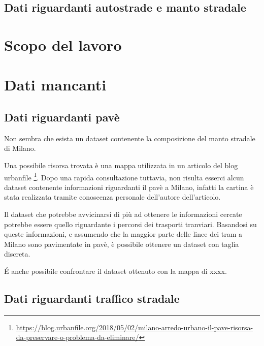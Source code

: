 \documentclass[a4paper]{report}
\begin{document}
\subsection{Dati riguardanti autostrade e manto stradale}

\section{Scopo del lavoro}

\section{Dati mancanti}

\subsection{Dati riguardanti pavè}
Non sembra che esista un dataset contenente la composizione del manto stradale di Milano.

Una possibile risorsa trovata è una mappa utilizzata in un articolo del blog urbanfile
\footnote{\url{https://blog.urbanfile.org/2018/05/02/milano-arredo-urbano-il-pave-risorsa-da-preservare-o-problema-da-eliminare/}}.
Dopo una rapida consultazione tuttavia, non risulta esserci alcun dataset contenente informazioni 
riguardanti il pavè a Milano, infatti la cartina è stata realizzata tramite conoscenza personale dell'autore dell'articolo.

Il dataset che potrebbe avvicinarsi di più ad ottenere le informazioni cercate potrebbe essere 
quello riguardante i percorsi dei trasporti tranviari. Basandosi su queste informazioni, e assumendo che 
la maggior parte delle linee dei tram a Milano sono pavimentate in pavè, è possibile ottenere un dataset con taglia  discreta.

\'E anche possibile confrontare il dataset ottenuto con la mappa di xxxx.

\subsection{Dati riguardanti traffico stradale}


\end{document}
